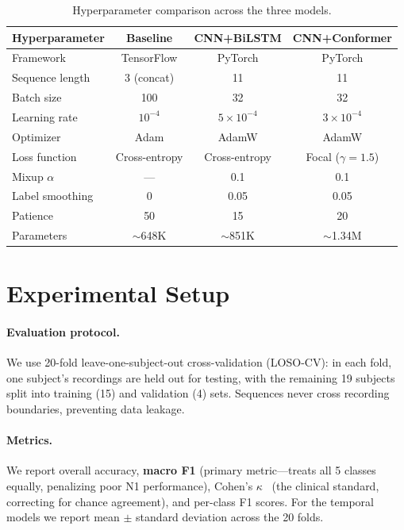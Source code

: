 \documentclass[final]{article}
\begin{document}
\begin{table}[t]
\caption{Hyperparameter comparison across the three models.}
\label{tab:hyperparams}
\centering
\small
\begin{tabular}{lccc}
\toprule
\textbf{Hyperparameter} & \textbf{Baseline} & \textbf{CNN+BiLSTM} & \textbf{CNN+Conformer} \\
\midrule
Framework        & TensorFlow   & PyTorch     & PyTorch \\
Sequence length  & 3 (concat)   & 11          & 11 \\
Batch size       & 100          & 32          & 32 \\
Learning rate    & $10^{-4}$    & $5 \times 10^{-4}$ & $3 \times 10^{-4}$ \\
Optimizer        & Adam         & AdamW       & AdamW \\
Loss function    & Cross-entropy & Cross-entropy & Focal ($\gamma\!=\!1.5$) \\
Mixup $\alpha$   & ---          & 0.1         & 0.1 \\
Label smoothing  & 0            & 0.05        & 0.05 \\
Patience         & 50           & 15          & 20 \\
Parameters       & $\sim$648K   & $\sim$851K  & $\sim$1.34M \\
\bottomrule
\end{tabular}
\end{table}

\section{Experimental Setup}

\paragraph{Evaluation protocol.}
We use 20-fold leave-one-subject-out cross-validation (LOSO-CV): in each fold, one subject's recordings are held out for testing, with the remaining 19 subjects split into training (15) and validation (4) sets. Sequences never cross recording boundaries, preventing data leakage.

\paragraph{Metrics.}
We report overall accuracy, \textbf{macro F1} (primary metric---treats all 5 classes equally, penalizing poor N1 performance), Cohen's $\kappa$~\cite{Cohen1960} (the clinical standard, correcting for chance agreement), and per-class F1 scores. For the temporal models we report mean $\pm$ standard deviation across the 20 folds.
\end{document}
